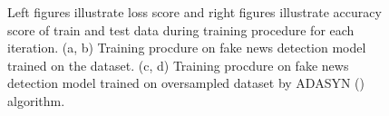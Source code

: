 \begin{figure}%
	\centering
	\qquad
	\qquad
	\qquad
	\caption{Left figures illustrate loss score and right figures illustrate accuracy score of train and test data during training procedure for each iteration. 
		(a, b) Training procdure on fake news detection model trained on the \cite{stance_persian} dataset.
		(c, d) Training procdure on fake news detection model trained on oversampled \cite{stance_persian} dataset by ADASYN (\cite{adasyn}) algorithm.}%
	\label{fig:fakenews}%
\end{figure}